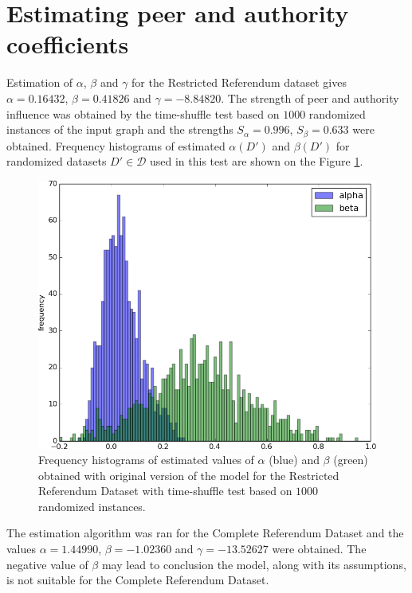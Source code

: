 \documentclass[times, utf8, zavrsni]{fer}
\begin{document}
\section{Estimating peer and authority coefficients}
Estimation of $\alpha$, $\beta$ and $\gamma$  for the Restricted Referendum dataset gives $\alpha = 0.16432$, $\beta = 0.41826 $ and $\gamma = -8.84820$. The strength of peer and authority influence was obtained by the time-shuffle test based on $1000$ randomized instances of the input graph and the strengths $S_{\alpha} = 0.996$, $S_{\beta} = 0.633$ were obtained. Frequency histograms of estimated $\alpha(D')$ and $\beta(D')$ for randomized datasets $D' \in \mathcal{D}$ used in this test are shown on the Figure \ref{hist_full}. 
\begin{figure}[htp]
\centering
\includegraphics[scale=0.6]{figs/abg1000.png}	
\caption{Frequency histograms of estimated values of $\alpha$ (blue) and $\beta$ (green)  obtained with original version of the model for the Restricted Referendum Dataset with time-shuffle test based on $1000$ randomized instances.}
\label{hist_full}
\end{figure}
								
The estimation algorithm was ran for the Complete Referendum Dataset and the values $\alpha=1.44990$, $\beta=-1.02360$ and $\gamma=-13.52627$ were obtained. The negative value of $\beta$ may lead to conclusion the model, along with its assumptions, is not suitable for  the Complete Referendum Dataset.
\end{document}

